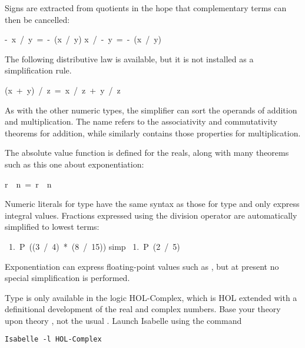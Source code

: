 Signs are extracted from quotients in the hope that complementary terms can
then be cancelled:
\begin{isabelle}
-\ x\ /\ y\ =\ -\ (x\ /\ y)
\isanewline
x\ /\ -\ y\ =\ -\ (x\ /\ y)
\end{isabelle}

The following distributive law is available, but it is not installed as a
simplification rule.
\begin{isabelle}
(x\ +\ y)\ /\ z\ =\ x\ /\ z\ +\ y\ /\ z%
\end{isabelle}

As with the other numeric types, the simplifier can sort the operands of
addition and multiplication.  The name  refers to the
associativity and commutativity theorems for addition, while similarly
 contains those properties for multiplication. 

The absolute value function  is
defined for the reals, along with many theorems such as this one about
exponentiation:
\begin{isabelle}
\isasymbar r\ \isacharcircum \ n\isasymbar\ =\ 
\isasymbar r\isasymbar \ \isacharcircum \ n
\end{isabelle}

Numeric literals
for type \isa{real} have the same syntax as those for type
 and only express integral values.  Fractions expressed
using the division operator are automatically simplified to lowest terms:
\begin{isabelle}
\ 1.\ P\ ((3\ /\ 4)\ *\ (8\ /\ 15))\isanewline
{} simp\isanewline
\ 1.\ P\ (2\ /\ 5)
\end{isabelle}
Exponentiation can express floating-point values such as
, but at present no special simplification
is performed.


\begin{warn}
Type  is only available in the logic HOL-Complex, which
is  HOL extended with a definitional development of the real and complex
numbers.  Base your theory upon theory
, not the usual .%
Launch Isabelle using the command 
\begin{verbatim}
Isabelle -l HOL-Complex
\end{verbatim}
\end{warn}

